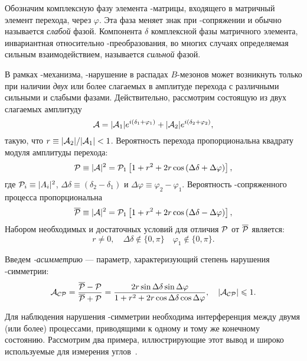 Обозначим комплексную фазу элемента \ckm-матрицы, входящего в матричный элемент перехода, через $\varphi$.  Эта фаза меняет знак при \cpconj-сопряжении и обычно называется \emph{слабой} фазой.  Компонента $\delta$ комплексной фазы матричного элемента, инвариантная относительно \cpconj-преобразования, во многих случаях определяемая сильным взаимодействием, называется \emph{сильной} фазой.

В рамках \km-механизма, \cpconj-нарушение в распадах $B$-мезонов может возникнуть только при наличии \emph{двух} или более слагаемых в амплитуде перехода с различными сильными и слабыми фазами.  Действительно, рассмотрим состоящую из двух слагаемых амплитуду
\begin{equation}\label{eq:cpv_amp_sum}
 \mathcal{A} = |\mathcal{A}_1|e^{i(\delta_1+\varphi_1)}+|\mathcal{A}_2|e^{i(\delta_2+\varphi_2)},
\end{equation}
такую, что $r \equiv |\mathcal{A}_2|/|\mathcal{A}_1|<1$.  Вероятность перехода пропорциональна квадрату модуля амплитуды перехода:
\begin{equation}\label{eq:cpv_amp_sum_norm}
 \mathcal{P} \equiv |\mathcal{A}|^2 = \mathcal{P}_1\left[1 + r^2 + 2r\cos\left(\Delta\delta + \Delta\varphi\right)\right],
\end{equation}
где $\mathcal{P}_i\equiv |A_i|^2$, $\Delta\delta \equiv \left(\delta_2-\delta_1\right)$ и $\Delta\varphi \equiv \varphi_2-\varphi_1$. Вероятность \cpconj-сопряженного процесса пропорциональна
\begin{equation}
 \overline{\mathcal{P}} \equiv |\mathcal{A}|^2 = \mathcal{P}_1\left[1 + r^2 + 2r\cos\left(\Delta\delta - \Delta\varphi\right)\right],
\end{equation}
Набором необходимых и достаточных условий для отличия $\mathcal{P}$ от $\overline{\mathcal{P}}$ является:
\begin{equation}
 r\neq0,\quad 
 \Delta\delta\notin \{0, \pi\} \quad 
 \varphi_1\notin \{0, \pi\}.
\end{equation}

Введем \emph{\cpconj-асимметрию} --- параметр, характеризующий степень нарушения \cpconj-симметрии:
\begin{equation}\label{eq:acp}
 \mathcal{A}_\mathcal{CP} = \frac{\overline{\mathcal{P}}-\mathcal{P}}{\overline{\mathcal{P}}+\mathcal{P}} = \frac{2r\sin{\Delta\delta}\sin{\Delta\varphi}}{1+r^2+2r\cos{\Delta\delta}\cos{\Delta\varphi}},\quad |\mathcal{A}_\mathcal{CP}|\leqslant1.
\end{equation}

Для наблюдения нарушения \cpconj-симметрии необходима интерференция между двумя (или более) процессами, приводящими к одному и тому же конечному состоянию.  Рассмотрим два примера, иллюстрирующие этот вывод и широко используемые для измерения углов~\ut.

